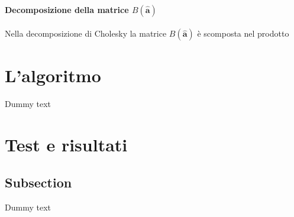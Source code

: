 \documentclass{article}
\begin{document}
\paragraph{Decomposizione della matrice $B(\mathbf{\hat{a}})$}
Nella decomposizione di Cholesky la matrice $B(\mathbf{\hat{a}})$ è scomposta nel prodotto



\newpage
	\section{L'algoritmo} \label{algoritmo}
	Dummy text
\newpage

\newpage
	\section{Test e risultati}
	\subsection{Subsection}

Dummy text

\newpage

 

\end{document}
